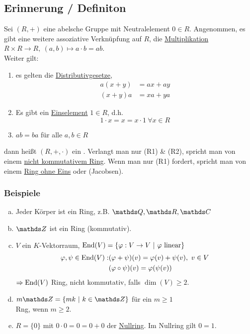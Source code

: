 \subsection{Erinnerung / Definiton}
\label{sub:erinnerung_def}
Sei $(R,+)$ eine abelsche Gruppe mit Neutralelement $0\in R$. Angenommen, es gibt eine weitere assoziative Verknüpfung auf $R$, die \uline{Multiplikation} $R\times R\to R,~ (a,b)\mapsto a\cdot b=ab$.\\
Weiter gilt: 
\begin{enumerate}[(R1)]
	\item es gelten die \uline{Distributivgesetze},
	\begin{equation*}
	\begin{aligned}
		a(x+y)&= ax+ay\\
		(x+y)a&= xa+ya
	\end{aligned}
	\end{equation*}
	\item Es gibt ein \uline{Einselement} $1\in R$, d.h. 
	\[
	1\cdot x=x=x\cdot 1~\forall x\in R
	\]
	\item $ab=ba$ für alle $a,b\in R$
\end{enumerate}
dann heißt $(R,+,\cdot)$ ein . Verlangt man nur (R1) \& (R2), spricht man von einem \uline{nicht kommutativem Ring}. Wenn man nur (R1) fordert, spricht man von einem \uline{Ring ohne Eins} oder  (Jacobsen).

\subsubsection*{Beispiele}
\begin{enumerate}[(a)]
	\item Jeder Körper ist ein Ring, z.B. $\Q,\R,\C$
	\item $\Z$ ist ein Ring (kommutativ).
	\item $V$ ein $K$-Vektorraum, $\operatorname{End}(V)=\{\varphi:V\to V~|~\varphi \text{ linear}\}$\\
	\begin{equation*}
	\begin{aligned}
		\varphi,\psi\in \operatorname{End}(V): &(\varphi+\psi)(v)=\varphi(v)+\psi(v),~v\in V\\
		&(\varphi\circ\psi)(v)=\varphi(\psi(v))
	\end{aligned}
	\end{equation*}
	$\Rightarrow \operatorname{End}(V)$ Ring, nicht kommutativ, falls $\dim(V)\ge 2$.
	\item $m\Z=\{mk~|~k\in \Z \}$ für ein $m\ge 1$\\
	Rng, wenn $m\ge 2$.
	\item $R=\{0\}$ mit $0\cdot 0=0=0+0$ der \uline{Nullring}. Im Nullring gilt $0=1$. 
\end{enumerate}

